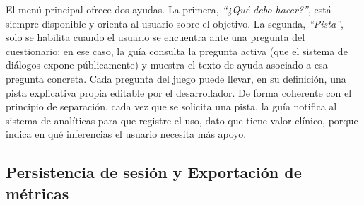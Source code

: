 \documentclass[12pt,twoside,titlepage]{report}
\begin{document}
El menú principal ofrece dos ayudas.
La primera, \textit{``¿Qué debo hacer?''}, está siempre disponible y orienta al usuario sobre el objetivo.
La segunda, \textit{``Pista''}, solo se habilita cuando el usuario se encuentra ante una pregunta del cuestionario: en ese caso, la guía consulta la pregunta activa (que el sistema de diálogos expone públicamente) y muestra el texto de ayuda asociado a esa pregunta concreta.
Cada pregunta del juego puede llevar, en su definición, una pista explicativa propia editable por el desarrollador.
De forma coherente con el principio de separación, cada vez que se solicita una pista, la guía notifica al sistema de analíticas para que registre el uso, dato que tiene valor clínico, porque indica en qué inferencias el usuario necesita más apoyo.

\subsection{Persistencia de sesión y Exportación de métricas}
\end{document}
